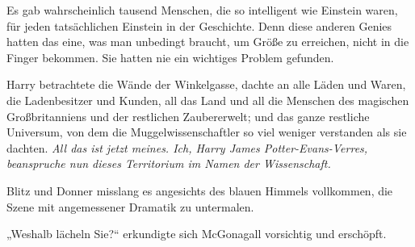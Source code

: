 
Es gab wahrscheinlich tausend Menschen, die so intelligent wie Einstein waren, für jeden tatsächlichen Einstein in der Geschichte. Denn diese anderen Genies hatten das eine, was man unbedingt braucht, um Größe zu erreichen, nicht in die Finger bekommen. Sie hatten nie ein wichtiges Problem gefunden.

Harry betrachtete die Wände der Winkelgasse, dachte an alle Läden und Waren, die Ladenbesitzer und Kunden, all das Land und all die Menschen des magischen Großbritanniens und der restlichen Zaubererwelt; und das ganze restliche Universum, von dem die Muggelwissenschaftler so viel weniger verstanden als sie dachten. \emph{All das ist jetzt meines. Ich, Harry James Potter-Evans-Verres, beanspruche nun dieses Territorium im Namen der Wissenschaft.}

Blitz und Donner misslang es angesichts des blauen Himmels vollkommen, die Szene mit angemessener Dramatik zu untermalen.

„Weshalb lächeln Sie?“ erkundigte sich McGonagall vorsichtig und erschöpft.

